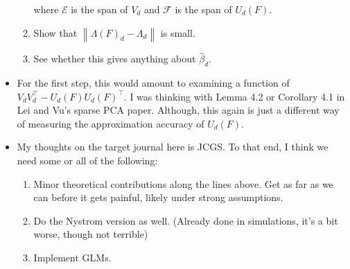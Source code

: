 \documentclass[11pt]{article}
\newcommand{\norm}[1]{\left\lVert #1 \right\rVert}
\begin{document}
\begin{itemize}
\begin{enumerate}
    where $\mathcal{E}$ is the span of $V_d$ and $\mathcal{F}$ is the
    span of $U_d(F)$.
  \item Show that $\norm{\Lambda(F)_d-\Lambda_d}$ is small.
  \item See whether this gives anything about $\hat{\beta}_d$.
  \end{enumerate}
\item For the first step, this would amount to examining a function of
  $V_dV_d^\top-U_d(F)U_d(F)^\top$. I was thinking with Lemma 4.2 or
  Corollary 4.1 in Lei and Vu's sparse PCA paper. Although, this again
  is just a different way of measuring the approximation accuracy of
  $U_d(F)$.
\item My thoughts on the target journal here is JCGS. To that end, I
  think we need some or all of the following:
  \begin{enumerate}
  \item Minor theoretical contributions along the lines above. Get as
    far as we can before it gets painful, likely under strong assumptions.
  \item Do the Nystrom version as well. (Already done in simulations,
    it's a bit worse, though not terrible)
  \item Implement GLMs.
  \end{enumerate}


\end{itemize}
\end{document}
